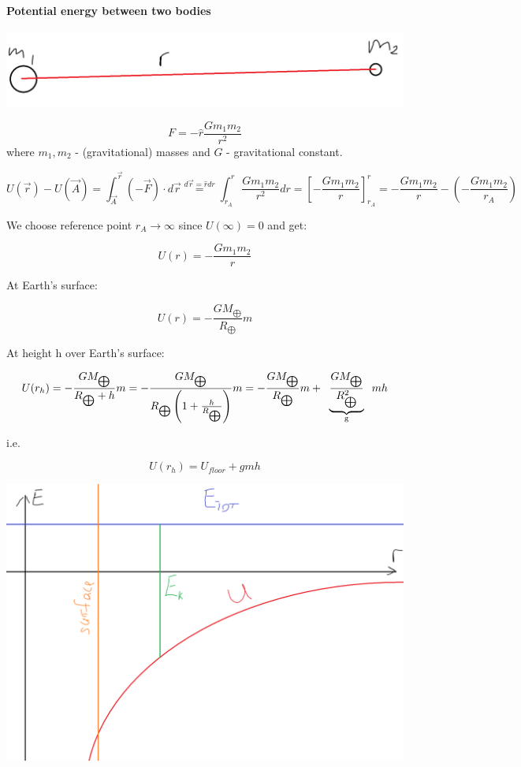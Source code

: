  	\paragraph{Potential energy between two bodies}
 	
 	

 	\begin{center}
 		\includegraphics[width=\linewidth]{./lect11/pic2.png}
 	\end{center}
 	$$F = -\hat{r} \frac{Gm_1m_2}{r^2}$$
 	where $m_1, m_2$ - (gravitational) masses and $G$ - gravitational constant.
 	
 	$$U(\vec{r}) - U(\vec{A}) = \int_{\vec{A}}^{\vec{r}} \left( - \vec{F} \right) \cdot d\vec{r} \stackrel{d\vec{r} = \hat{r} dr}{=} \int_{r_A}^{r} \frac{Gm_1m_2}{r^2} dr = \left[ - \frac{G m_1 m_2}{r} \right]^r_{r_A} = -\frac{Gm_1m_2}{r} - \left( - \frac{Gm_1m_2}{r_A}\right)$$
 	
 	We choose reference point $r_A \to \infty$ since $U(\infty) = 0$ and get:
 	
 	$$U(r) = - \frac{G m_1 m_2}{r}$$
 	
 	At Earth's surface:
 	
 	$$U(r) = - \frac{G M_{\bigoplus}}{R_{\bigoplus}}m$$
 	
 	At height h over Earth's surface:
 	
 	$$U(r_h)= - \frac{G M_{\bigoplus}}{R_{\bigoplus}+ h}m = -\frac{G M_{\bigoplus}}{R_{\bigoplus} \left( 1 + \frac{h}{R_{\bigoplus}} \right)}m = - \frac{G M_{\bigoplus}}{R_{\bigoplus}}m + \underbrace{\frac{G M_{\bigoplus}}{R_{\bigoplus}^2}}_{\parbox{1.5cm}{\centering \scriptsize g}}mh$$
 	
 	i.e.
 	
 	$$U(r_h) = U_{floor} + gmh$$
 	
 	
 	\begin{center}
 		\includegraphics[width=\linewidth]{./lect11/pic3.png}
 	\end{center}
 	
